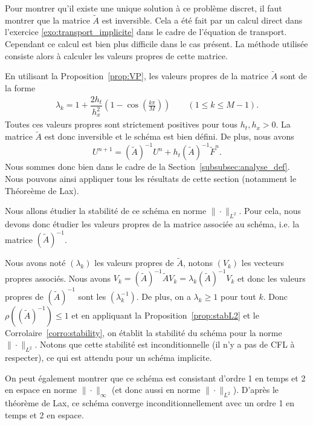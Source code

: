 \documentclass[12pt,a4paper,twoside]{article}
\begin{document}
Pour montrer qu'il existe une unique solution \`a ce probl\`eme discret,
il faut montrer que la matrice $\widetilde{A}$ est inversible.
Cela a \'et\'e fait par un calcul direct dans l'exercice \ref{exo:transport_implicite}
dans le cadre de l'\'equation de transport.
Cependant ce calcul est bien plus difficile dans le cas pr\'esent.
La m\'ethode utilis\'ee consiste alors \`a calculer les valeurs propres de cette matrice.

En utilisant la Proposition~\ref{prop:VP}, les valeurs propres de la matrice $\widetilde{A}$
sont de la forme
\begin{align*}
  \lambda_k = 1 + \dfrac{2 h_t}{h_x^2} \left(1 - \cos \left(\frac{k \pi}{M} \right) \right)
  \qquad (1 \leq k \leq M-1) .
\end{align*}
Toutes ces valeurs propres sont strictement positives pour tous $h_t , h_x > 0$. 
La matrice $\widetilde{A}$ est donc inversible et le sch\'ema est bien d\'efini.
De plus, nous avons
\begin{equation*}
  U^{n+1} = (\widetilde{A})^{-1} U^n + h_t (\widetilde{A})^{-1} \widetilde{F}^n .
\end{equation*}
Nous sommes donc bien dans le cadre de la Section~\ref{subsubsec:analyse_def}.
Nous pouvons ainsi appliquer tous les r\'esultats de cette section
(notamment le Th\'eore\`eme de Lax).

Nous allons \'etudier la stabilit\'e de ce sch\'ema en norme $\| \cdot \|_{L^2}$.
Pour cela, nous devons donc \'etudier les valeurs propres de la matrice associ\'ee au sch\'ema,
i.e. la matrice $(\widetilde{A})^{-1}$.

Nous avons not\'e $(\lambda_k)$ les valeurs propres de $\widetilde{A}$, notons $(V_k)$
les vecteurs propres associ\'es. Nous avons
$V_k = (\widetilde{A})^{-1} \widetilde{A} V_k = \lambda_k (\widetilde{A})^{-1} V_k$
et donc les valeurs propres de $(\widetilde{A})^{-1}$ sont les
$(\lambda_k^{-1})$. De plus, on a $\lambda_k \geq 1$ pour tout $k$.
Donc $\rho((\widetilde{A})^{-1}) \leq 1$ et en appliquant
la Proposition~\ref{prop:stabL2} et le Corrolaire~\ref{corro:stability}, on
\'etablit la stabilit\'e du sch\'ema pour la norme $\| \cdot \|_{L^2}$.
Notons que cette stabilit\'e est inconditionnelle (il n'y a pas de CFL \`a respecter),
ce qui est attendu pour un sch\'ema implicite.


On peut \'egalement montrer que ce sch\'ema est consistant d'ordre 1 en temps
et 2 en espace en norme $\| \cdot \|_{\infty}$ (et donc aussi en norme $\| \cdot \|_{L^2}$).
D'apr\`es le th\'eor\`eme de Lax, ce sch\'ema converge inconditionnellement avec un ordre
1 en temps et 2 en espace.
\end{document}
